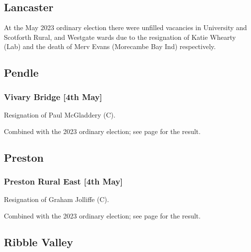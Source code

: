 \documentclass[a4paper,openany]{book}
\begin{document}
\begin{resultsiii}
\subsection*{Lancaster}

At the May 2023 ordinary election there were unfilled vacancies in University and Scotforth Rural, and Westgate wards due to the resignation of Katie Whearty (Lab) and the death of Merv Evans (Morecambe Bay Ind) respectively.%
%

\subsection*{Pendle}

\subsubsection*{Vivary Bridge \hspace*{\fill}\nolinebreak[1]%
	\enspace\hspace*{\fill}
	[4th May]}


Resignation of Paul McGladdery (C).

Combined with the 2023 ordinary election; see page \pageref{VivaryBridgePendle} for the result.

\subsection*{Preston}

\subsubsection*{Preston Rural East \hspace*{\fill}\nolinebreak[1]%
	\enspace\hspace*{\fill}
	[4th May]}


Resignation of Graham Jolliffe (C).

Combined with the 2023 ordinary election; see page \pageref{PrestonPrestonRuralEast} for the result.

\subsection*{Ribble Valley}


\end{resultsiii}
\end{document}
